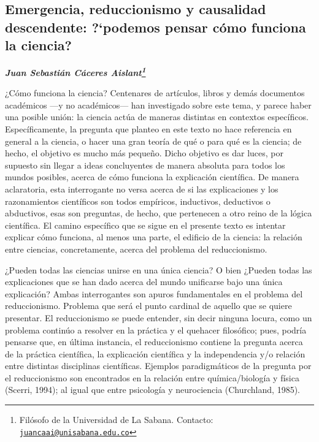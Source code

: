 \documentclass[]{book}
\newcommand{\autor}[1]{            %
  \begin{center}                   %
    \vspace*{-3.5em}               %
    \textbf{\textit{\large #1}}    %
    \vspace*{+4em}                 %
  \end{center}
}
\begin{document}
\begin{refsection}
\chapter{\texorpdfstring{\textbf{Emergencia, reduccionismo y causalidad
descendente: ?`podemos pensar cómo funciona la
ciencia?}}{Emergencia, reduccionismo y causalidad descendente: ?`podemos pensar cómo funciona la ciencia?}}\label{emergencia-reduccionismo-y-causalidad-descendente-podemos-pensar-cuxf3mo-funciona-la-ciencia}

\autor{Juan Sebastián Cáceres Aislant\footnote{Filósofo de la
  Universidad de La Sabana. Contacto:
  \href{mailto:juancaai@unisabana.edu.co}{\nolinkurl{juancaai@unisabana.edu.co}}}}

¿Cómo funciona la ciencia? Centenares de artículos, libros y demás
documentos académicos ---y no académicos--- han investigado sobre este
tema, y parece haber una posible unión: la ciencia actúa de maneras
distintas en contextos específicos. Específicamente, la pregunta que
planteo en este texto no hace referencia en general a la ciencia, o
hacer una gran teoría de qué o para qué es la ciencia; de hecho, el
objetivo es mucho más pequeño. Dicho objetivo es dar luces, por supuesto
sin llegar a ideas concluyentes de manera absoluta para todos los mundos
posibles, acerca de cómo funciona la explicación científica. De manera
aclaratoria, esta interrogante no versa acerca de si las explicaciones y
los razonamientos científicos son todos empíricos, inductivos,
deductivos o abductivos, esas son preguntas, de hecho, que pertenecen a
otro reino de la lógica científica. El camino específico que se sigue en
el presente texto es intentar explicar cómo funciona, al menos una
parte, el edificio de la ciencia: la relación entre ciencias,
concretamente, acerca del problema del reduccionismo.

¿Pueden todas las ciencias unirse en una única ciencia? O bien ¿Pueden
todas las explicaciones que se han dado acerca del mundo unificarse bajo
una única explicación? Ambas interrogantes son apuros fundamentales en
el problema del reduccionismo. Problema que será el punto cardinal de
aquello que se quiere presentar. El reduccionismo se puede entender, sin
decir ninguna locura, como un problema continúo a resolver en la
práctica y el quehacer filosófico; pues, podría pensarse que, en última
instancia, el reduccionismo contiene la pregunta acerca de la práctica
científica, la explicación científica y la independencia y/o relación
entre distintas disciplinas científicas. Ejemplos paradigmáticos de la
pregunta por el reduccionismo son encontrados en la relación entre
química/biología y física (Scerri, 1994); al igual que entre
psicología y neurociencia (Churchland, 1985).


\end{refsection}
\end{document}
